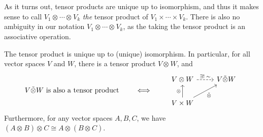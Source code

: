 \documentclass[twoside,10pt]{article}
\begin{document}
As it turns out, tensor products are unique up to isomorphism, and thus it makes sense to call $V_1 \otimes_{}\cdots \otimes_{}V_{k}$ \textit{the} tensor product of $V_1 \times \cdots \times V_{k}$. There is also no ambiguity in our notation $V_1 \otimes_{}\cdots \otimes_{}V_{k}$, as the taking the tensor product is an associative operation.

\begin{thrm}[]
	The tensor product is unique up to (unique) isomorphism. In particular, for all vector spaces $ V$ and $ W$, there is a tensor product $V \otimes_{}W$, and
	\begin{equation*}
        \begin{aligned}[c]
                V \tilde{\otimes} W \text{ is also a tensor product}
        \end{aligned}
        \qquad\iff\qquad
        \begin{aligned}[c]
                \begin{tikzcd}
                        V \otimes W \rar[dashed]{\exists!\;\sim} & V \tilde{\otimes} W \\
                        V\times W \uar{\otimes}\arrow[ur,"\tilde{\otimes}"']
                \end{tikzcd}
        \end{aligned}
        \end{equation*}
	Furthermore, for any vector spaces $A,B,C$, we have $(A \otimes_{}B)\otimes_{}C \cong A \otimes_{}(B \otimes_{}C)$.
\end{thrm}
\end{document}
